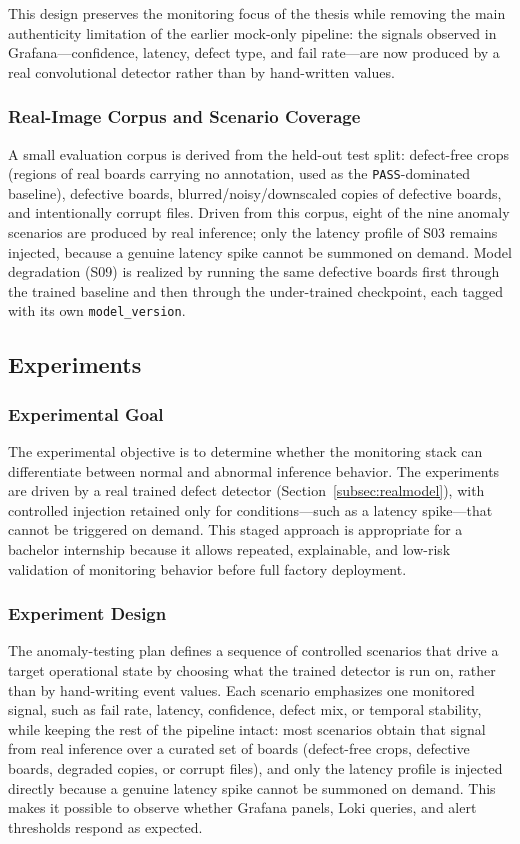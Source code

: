 \documentclass[12pt,a4paper]{article}
\begin{document}
This design preserves the monitoring focus of the thesis while removing the main
authenticity limitation of the earlier mock-only pipeline: the signals observed
in Grafana---confidence, latency, defect type, and fail rate---are now produced by
a real convolutional detector rather than by hand-written values.

\subsubsection{Real-Image Corpus and Scenario Coverage}
A small evaluation corpus is derived from the held-out test split: defect-free
crops (regions of real boards carrying no annotation, used as the
\texttt{PASS}-dominated baseline), defective boards, blurred/noisy/downscaled
copies of defective boards, and intentionally corrupt files. Driven from this
corpus, eight of the nine anomaly scenarios are produced by real inference; only
the latency profile of S03 remains injected, because a genuine latency spike
cannot be summoned on demand. Model degradation (S09) is realized by running the
same defective boards first through the trained baseline and then through the
under-trained checkpoint, each tagged with its own \texttt{model\_version}.

\subsection{Experiments}\label{subsec:experiments}

\subsubsection{Experimental Goal}
The experimental objective is to determine whether the monitoring stack can
differentiate between normal and abnormal inference behavior. The experiments are
driven by a real trained defect detector (Section~\ref{subsec:realmodel}), with controlled injection
retained only for conditions---such as a latency spike---that cannot be triggered
on demand. This staged approach is appropriate for a bachelor internship because
it allows repeated, explainable, and low-risk validation of monitoring behavior
before full factory deployment.

\subsubsection{Experiment Design}
The anomaly-testing plan defines a sequence of controlled scenarios that drive a
target operational state by choosing what the trained detector is run on, rather
than by hand-writing event values. Each scenario emphasizes one monitored signal,
such as fail rate, latency, confidence, defect mix, or temporal stability, while
keeping the rest of the pipeline intact: most scenarios obtain that signal from
real inference over a curated set of boards (defect-free crops, defective boards,
degraded copies, or corrupt files), and only the latency profile is injected
directly because a genuine latency spike cannot be summoned on demand. This makes
it possible to observe whether Grafana panels, Loki queries, and alert thresholds
respond as expected.
\end{document}
